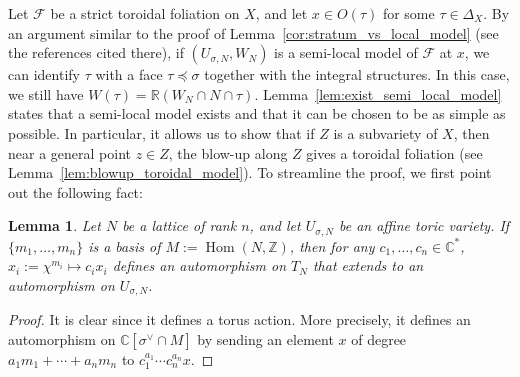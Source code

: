 \documentclass[12pt,reqno]{amsart}
\newtheorem{lemma}[theorem]{Lemma}
\theoremstyle{definition}
\newcommand{\on}{\operatorname}
\newcommand\cF{{\mathcal{F}}}
\newcommand\bC{{\mathbb C}}
\newcommand\bR{{\mathbb R}}
\newcommand\bZ{{\mathbb Z}}
\begin{document}
Let $\cF$ be a strict toroidal foliation on $X$, and let $x\in O(\tau)$ for some $\tau\in\Delta_X$. By an argument similar to the proof of Lemma~\ref{cor:stratum_vs_local_model} (see the references cited there), if $(U_{\sigma,N},W_N)$ is a semi-local model of $\cF$ at $x$, we can identify $\tau$ with a face $\tau\preceq\sigma$ together with the integral structures. In this case, we still have $W(\tau)=\bR(W_N\cap N \cap \tau)$. Lemma~\ref{lem:exist_semi_local_model} states that a semi-local model exists and that it can be chosen to be as simple as possible. In particular, it allows us to show that if $Z$ is a subvariety of $X$, then near a general point $z\in Z$, the blow-up along $Z$ gives a toroidal foliation (see Lemma~\ref{lem:blowup_toroidal_model}).  To streamline the proof, we first point out the following fact:
   


\begin{lemma}\label{lem:local_isomorphism_of_affine_toric_variety}
    Let $N$ be a lattice of rank $n$, and let $U_{\sigma,N}$ be an affine toric variety. 
    If $\{m_1,\ldots,m_n\}$ is a basis of $M:=\on{Hom}(N,\bZ)$, then for any $c_1,\ldots,c_n\in\bC^*$, $x_i:=\chi^{m_i}\mapsto c_i x_i$ defines an automorphism on $T_N$ that extends to an automorphism on $U_{\sigma,N}$. 
\end{lemma}
\begin{proof}
    It is clear since it defines a torus action. More precisely, it defines an automorphism on $\bC[\sigma^\vee\cap M]$ by sending an element $x$ of degree $a_1m_1+\cdots+a_n m_n$ to $c_1^{a_1}\cdots c_n^{a_n} x$.
\end{proof}
\end{document}
